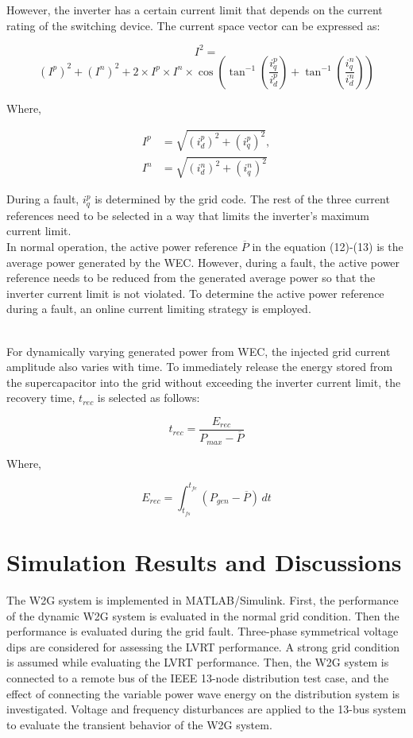 \documentclass[conference]{IEEEtran}
\begin{document}
However, the inverter has a certain current limit that depends on the current rating of the switching device. The current space vector can be expressed as:

\begin{equation}
I^2 = 
\end{equation}\[
(I^p)^2 + (I^n)^2 + 2 \times I^p \times I^n \times \cos\left(\tan^{-1}\left(\frac{i_q^p}{i_d^p}\right) + \tan^{-1}\left(\frac{i_q^n}{i_d^n}\right)\right)\]

Where,

\begin{align*}
I^p &= \sqrt{(i_d^p)^2 + (i_q^p)^2}, \\
I^n &= \sqrt{(i_d^n)^2 + (i_q^n)^2}
\end{align*}

During a fault, $i_q^p$ is determined by the grid code. The rest of the three current references need to be selected in a way that limits the inverter's maximum current limit.\\

In normal operation, the active power reference $\overline{P}$ in the equation (12)-(13) is the average power generated by the WEC. However, during a fault, the active power reference needs to be reduced from the generated average power so that the inverter current limit is not violated. To determine the active power reference during a fault, an online current limiting strategy is employed.

\\
For dynamically varying generated power from WEC, the injected grid current amplitude also varies with time. To immediately release the energy stored from the supercapacitor into the grid without exceeding the inverter current limit, the recovery time, $t_{rec}$ is selected as follows:

\begin{equation}
t_{rec} = \frac{E_{rec}}{P_{max} - \overline{P}}
\end{equation}

Where,

\begin{equation}
E_{rec} = \int_{t_{fs}}^{t_{fe}} (P_{gen} - \overline{P})\, dt
\end{equation}

\section{Simulation Results and Discussions}
The W2G system is implemented in MATLAB/Simulink. First, the performance of the dynamic W2G system is evaluated in the normal grid condition. Then the performance is evaluated during the grid fault. Three-phase symmetrical voltage dips are considered for assessing the LVRT performance. A strong grid condition is assumed while evaluating the LVRT performance. Then, the W2G system is connected to a remote bus of the IEEE 13-node distribution test case, and the effect of connecting the variable power wave energy on the distribution system is investigated. Voltage and frequency disturbances are applied to the 13-bus system to evaluate the transient behavior of the W2G system.
\end{document}
